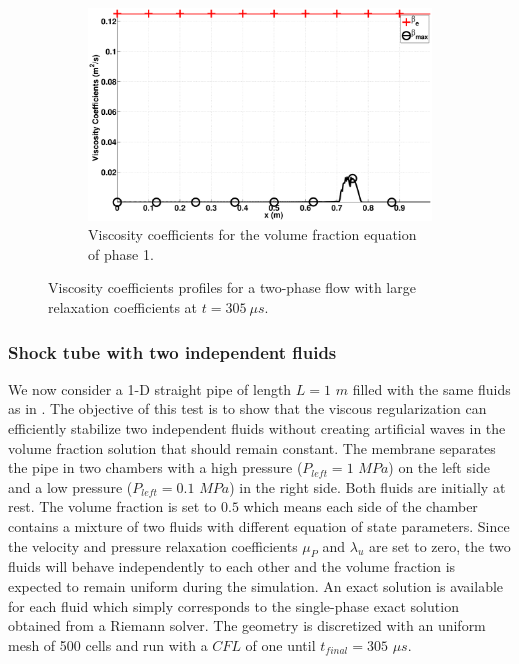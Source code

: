 \documentclass[preprint,10pt]{elsarticle}
\begin{document}
\begin{figure}[H]
        \begin{subfigure}[b]{0.495\textwidth}
                \centering
                \includegraphics[width=\textwidth]{figures/liquid_beta.eps}
                \caption{Viscosity coefficients for the volume fraction equation of phase 1.}
                \label{fig:adv-vf-beta}
        \end{subfigure}        
        \caption{Viscosity coefficients profiles for a two-phase flow with large relaxation coefficients at $t=305 \ \mu s$.}\label{adv-vf-visc}
\end{figure}
%
\subsubsection{Shock tube with two independent fluids}\label{sec:shock-tube-two-indep-fluids}
%
We now consider a 1-D straight pipe of length $L=1$ $m$ filled with the same fluids as in . The objective of this test is to show that 
the viscous regularization can efficiently stabilize two independent fluids without creating artificial waves in the volume fraction solution that should remain 
constant. The membrane separates the pipe in two chambers with a high pressure ($P_{left} = 1$ $MPa$) on the left side and a low pressure ($P_{left} = 0.1$ 
$MPa$) in the right side. Both fluids are initially at rest. The volume fraction is set to $0.5$ which means each side of the chamber contains a mixture of two 
fluids with different equation of state parameters. Since the velocity and pressure relaxation coefficients $\mu_P$ and $\lambda_u$ are set to zero, the two 
fluids will behave independently to each other and the volume fraction is expected to remain uniform during the simulation. An exact solution is available for 
each fluid which simply corresponds to the single-phase exact solution obtained from a Riemann solver. The geometry is discretized with an uniform mesh of 
500 cells and run with a $CFL$ of one until $t_{final} = 305$ $\mu s$.
%
\end{document}
